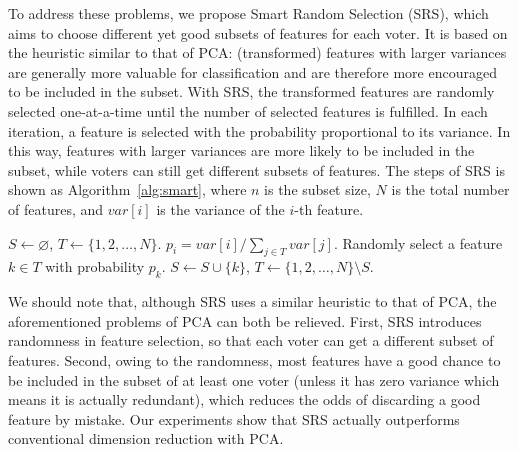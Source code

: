 \documentclass[10pt, final, letter, twocolumns]{IEEEtran}
\begin{document}
To address these problems, we propose Smart Random Selection (SRS), which aims to choose different yet good subsets of features for each voter. It is based on the heuristic similar to that of PCA: (transformed) features with larger variances are generally more valuable for classification and are therefore more encouraged to be included in the subset. With SRS, the transformed features are randomly selected one-at-a-time until the number of selected features is fulfilled. In each iteration, a feature is selected with the probability proportional to its variance. In this way, features with larger variances are more likely to be included in the subset, while voters can still get different subsets of features. The steps of SRS is shown as Algorithm~\ref{alg:smart}, where $n$ is the subset size, $N$ is the total number of features, and $var[i]$ is the variance of the $i$-th feature.
\vspace{-2mm}
\begin{algorithm}[H]
\caption{\textsc{SmartRandom}\,$(n, var[1\dots N])$}
\label{alg:smart}
\begin{algorithmic}[1]
\State $S \leftarrow \varnothing$, $T \leftarrow \{1,2,\dots,N\}$.
\State $p_i=var[i]/\sum_{j\in T} var[j]$.
\EndFor
\State Randomly select a feature $k\in T$ with probability $p_k$. 
\State $S\leftarrow S\cup{\{k\}}$, $T \leftarrow \{1,2,\dots,N\}\setminus S$.
\EndWhile
\end{algorithmic}
\end{algorithm}
\vspace{-2mm}

We should note that, although SRS uses a similar heuristic to that of PCA, the aforementioned problems of PCA can both be relieved. First, SRS introduces randomness in feature selection, so that each voter can get a different subset of features. Second, owing to the randomness, most features have a good chance to be included in the subset of at least one voter (unless it has zero variance which means it is actually redundant), which reduces the odds of discarding a good feature by mistake. Our experiments show that SRS actually outperforms conventional dimension reduction with PCA.

\vspace{-1mm}
\end{document}
